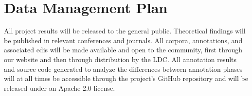 \documentclass[11pt]{article}
\begin{document}
\section*{Data Management Plan}

All project results will be released to the general public. Theoretical findings will be published in relevant conferences and journals. All corpora, annotations, and associated {\sc cdi}s will be made available and open to the community, first through our website and then through distribution by the LDC. All annotation results and  
source code generated to 
analyze the differences  between annotation phases  will at all times be accessible through the project's GitHub repository and will be released under an Apache 2.0 license. 

\end{document}

